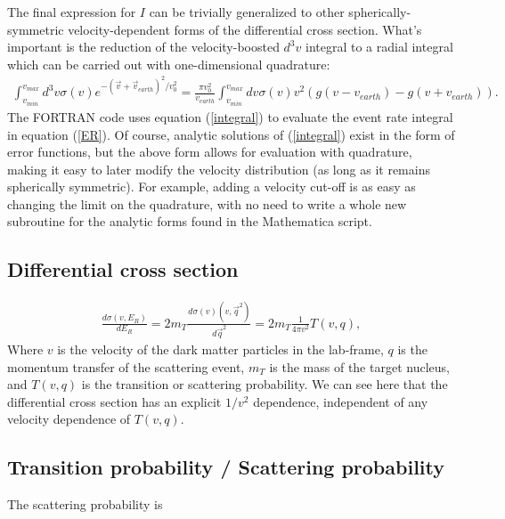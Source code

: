 \documentclass[11pt]{amsart}
\begin{document}
The final expression for $I$ can be trivially generalized to other spherically-symmetric velocity-dependent forms of the differential cross section. What's important is the reduction of the velocity-boosted $d^3v$ integral to a radial integral which can be carried out with one-dimensional quadrature:
\begin{equation}\label{integral}
\begin{split}
\int_{v_{min}}^{v_{max}} d^3v \sigma(v) e^{-(\vec{v}+\vec{v}_{earth})^2/v_0^2} 
	= \frac{\pi v_0^2}{v_{earth} }\int_{v_{min}}^{v_{max}} dv \sigma(v) v^2\left( g(v-v_{earth}) - g(v+v_{earth}) \right).
\end{split}
\end{equation}
The FORTRAN code uses equation (\ref{integral}) to evaluate the event rate integral in equation (\ref{ER}). Of course, analytic solutions of  (\ref{integral}) exist in the form of error functions, but the above form allows for evaluation with quadrature, making it easy to later modify the velocity distribution (as long as it remains spherically symmetric). For example, adding a velocity cut-off is as easy as changing the limit on the quadrature, with no need to write a whole new subroutine for the analytic forms found in the Mathematica script.

\subsection{Differential cross section}\label{crosssection}
\begin{equation}
\begin{split}
\frac{d\sigma(v,E_R)}{dE_R} = 2m_T \frac{d\sigma(v)(v,\vec{q}^2)}{d\vec{q}^2} = 2m_T\frac{1}{4\pi v^2}T(v,q),
\end{split}
\end{equation}
Where $v$ is the velocity of the dark matter particles in the lab-frame, $q$ is the momentum transfer of the scattering event, $m_T$ is the mass of the target nucleus, and $T(v,q)$ is the transition or scattering probability. We can see here that the differential cross section has an explicit $1/v^2$ dependence, independent of any velocity dependence of $T(v,q)$.


\subsection{Transition probability / Scattering probability}

The scattering probability is
\end{document}

